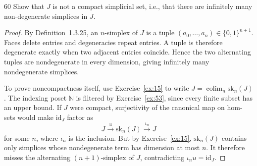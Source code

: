 \begin{exercise}{60}
Show that $J$ is not a compact simplicial set, i.e., that there are infinitely many
non-degenerate simplices in $J$.

\begin{proof}
By Definition~1.3.25, an $n$-simplex of $J$ is a tuple
$(a_0,\ldots,a_n)\in\{0,1\}^{n+1}$.
Faces delete entries and degeneracies repeat entries.
A tuple is therefore degenerate exactly when two adjacent
entries coincide. Hence the two alternating tuples are
nondegenerate in every dimension, giving infinitely many
nondegenerate simplices.

To prove noncompactness itself, use Exercise~\ref{ex:15} to write
$J=\operatorname*{colim}_n\mathrm{sk}_n(J)$.
The indexing poset $\mathbb N$ is filtered by
Exercise~\ref{ex:53}, since every finite subset has an upper bound.
If $J$ were compact, surjectivity of the canonical map on hom-sets
would make $\mathrm{id}_J$ factor as
\[
 J\xrightarrow{u}\mathrm{sk}_n(J)
 \xrightarrow{\ \iota_n\ }J
\]
for some $n$, where $\iota_n$ is the inclusion.
But by Exercise~\ref{ex:15}, $\mathrm{sk}_n(J)$ contains only
simplices whose nondegenerate term has dimension at most $n$.
It therefore misses the alternating $(n+1)$-simplex of $J$,
contradicting $\iota_nu=\mathrm{id}_J$.
\end{proof}
\end{exercise}
